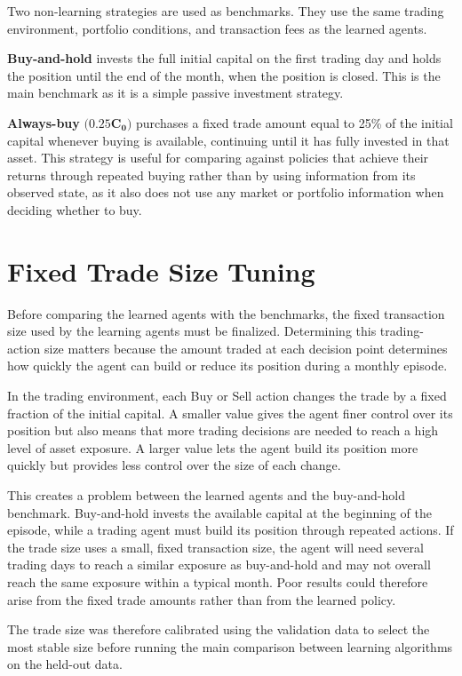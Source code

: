 Two non-learning strategies are used as benchmarks. They use the same
trading environment, portfolio conditions, and transaction fees as the
learned agents.

\textbf{Buy-and-hold} invests the full initial capital on the first
trading day and holds the position until the end of the month, when the
position is closed. This is the main benchmark as it is a simple passive
investment strategy.

\textbf{Always-buy} \(\mathbf{(0.25}\mathbf{C}_{\mathbf{0}}\mathbf{)}\)
purchases a fixed trade amount equal to 25\% of the initial capital
whenever buying is available, continuing until it has fully invested in
that asset. This strategy is useful for comparing against policies that
achieve their returns through repeated buying rather than by using
information from its observed state, as it also does not use any market
or portfolio information when deciding whether to buy.

\section{Fixed Trade Size Tuning}

Before comparing the learned agents with the benchmarks, the fixed
transaction size used by the learning agents must be finalized.
Determining this trading-action size matters because the amount traded
at each decision point determines how quickly the agent can build or
reduce its position during a monthly episode.

In the trading environment, each Buy or Sell action changes the trade by
a fixed fraction of the initial capital. A smaller value gives the agent
finer control over its position but also means that more trading
decisions are needed to reach a high level of asset exposure. A larger
value lets the agent build its position more quickly but provides less
control over the size of each change.

This creates a problem between the learned agents and the buy-and-hold
benchmark. Buy-and-hold invests the available capital at the beginning
of the episode, while a trading agent must build its position through
repeated actions. If the trade size uses a small, fixed transaction
size, the agent will need several trading days to reach a similar
exposure as buy-and-hold and may not overall reach the same exposure
within a typical month. Poor results could therefore arise from the
fixed trade amounts rather than from the learned policy.

The trade size was therefore calibrated using the validation data to
select the most stable size before running the main comparison between
learning algorithms on the held-out data.

